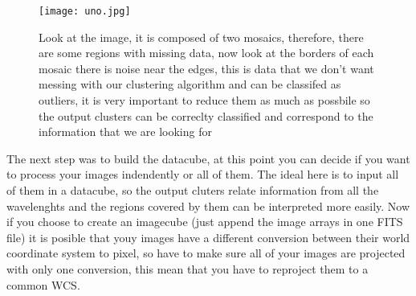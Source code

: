 \documentclass[11pt,fleqn]{book} %
\begin{document}
																																																																																																																																																																																																	\begin{figure}[h]
																																																																																																																																																																																																		\centering
																																																																																																																																																																																																		    \texttt{[image: uno.jpg]}
																																																																																																																																																																																																		        \caption{Look at the image, it is composed of two mosaics, therefore, there are some regions with missing data, now look at the borders of each mosaic there is noise near the edges, this is data that we don't want messing with our clustering algorithm and can be classifed as outliers, it is very important to reduce them as much as possbile so the output clusters can be correclty classified and correspond to the information that we are looking for}
																																																																																																																																																																																																			    \label{img:dos}
																																																																																																																																																																																																			    \end{figure}

																																																																																																																																																																																																			    The next step was to build the datacube, at this point you can decide if you want to process your images indendently or all of them. The ideal here is to input all of them in a datacube, so the output cluters relate information from all the wavelenghts and the regions covered by them can be interpreted more easily. Now if you choose to create an imagecube (just append the image arrays in one FITS file) it is posible that youy images have a different conversion between their world coordinate system to pixel, so have to make sure all of your images are projected with only one conversion, this mean that you have to reproject them to a common WCS.
\end{document}
